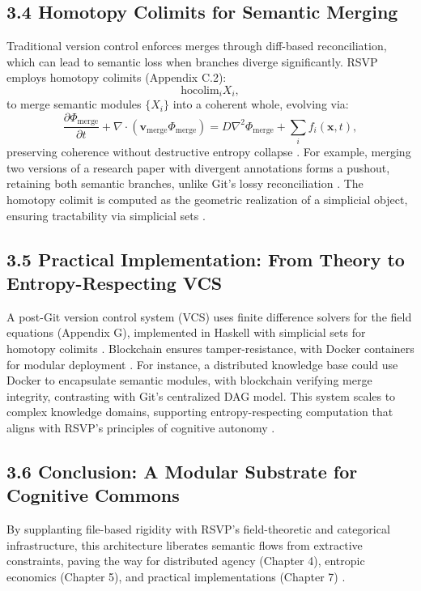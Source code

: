 \documentclass[12pt]{article}
\begin{document}
\subsection*{3.4 Homotopy Colimits for Semantic Merging}
Traditional version control enforces merges through diff-based reconciliation, which can lead to semantic loss when branches diverge significantly. RSVP employs homotopy colimits (Appendix C.2):
\[
\text{hocolim}_i X_i,
\]
to merge semantic modules \(\{X_i\}\) into a coherent whole, evolving via:
\[
\frac{\partial \Phi_{\text{merge}}}{\partial t} + \nabla \cdot (\mathbf{v}_{\text{merge}} \Phi_{\text{merge}}) = D \nabla^2 \Phi_{\text{merge}} + \sum_i f_i(\mathbf{x}, t),
\]
preserving coherence without destructive entropy collapse \citep{hatcher2002}. For example, merging two versions of a research paper with divergent annotations forms a pushout, retaining both semantic branches, unlike Git's lossy reconciliation \citep{milewski2018}. The homotopy colimit is computed as the geometric realization of a simplicial object, ensuring tractability via simplicial sets \citep{may1999}.
\subsection*{3.5 Practical Implementation: From Theory to Entropy-Respecting VCS}
A post-Git version control system (VCS) uses finite difference solvers for the field equations (Appendix G), implemented in Haskell with simplicial sets for homotopy colimits \citep{milewski2018}. Blockchain ensures tamper-resistance, with Docker containers for modular deployment \citep{bird1988}. For instance, a distributed knowledge base could use Docker to encapsulate semantic modules, with blockchain verifying merge integrity, contrasting with Git's centralized DAG model. This system scales to complex knowledge domains, supporting entropy-respecting computation that aligns with RSVP's principles of cognitive autonomy \citep{whitehead1978}.
\subsection*{3.6 Conclusion: A Modular Substrate for Cognitive Commons}
By supplanting file-based rigidity with RSVP's field-theoretic and categorical infrastructure, this architecture liberates semantic flows from extractive constraints, paving the way for distributed agency (Chapter 4), entropic economics (Chapter 5), and practical implementations (Chapter 7) \citep{deleuze1987, whitehead1978}.
\end{document}
